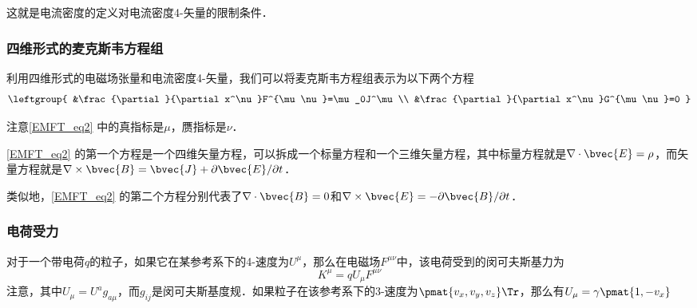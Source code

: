 这就是电流密度的定义对电流密度4-矢量的限制条件．


\subsubsection{四维形式的麦克斯韦方程组}

利用四维形式的电磁场张量和电流密度4-矢量，我们可以将麦克斯韦方程组表示为以下两个方程
\begin{equation}\label{EMFT_eq2}
\leftgroup{
    &\frac{\partial}{\partial x^\nu}F^{\mu\nu}=\mu_0J^\mu\\
    &\frac{\partial}{\partial x^\nu}G^{\mu\nu}=0
}
\end{equation}

注意\autoref{EMFT_eq2} 中的真指标是$\mu$，赝指标是$\nu$．

\autoref{EMFT_eq2} 的第一个方程是一个四维矢量方程，可以拆成一个标量方程和一个三维矢量方程，其中标量方程就是$\nabla\cdot\bvec{E}=\rho$，而矢量方程就是$\nabla\times\bvec{B}=\bvec{J}+\partial\bvec{E}/\partial t$． 

类似地，\autoref{EMFT_eq2} 的第二个方程分别代表了$\nabla\cdot\bvec{B}=0$和$\nabla\times\bvec{E}=-\partial\bvec{B}/\partial t$．

\subsubsection{电荷受力}

对于一个带电荷$q$的粒子，如果它在某参考系下的4-速度为$U^\mu$，那么在电磁场$F^{\mu\nu}$中，该电荷受到的闵可夫斯基力为
\begin{equation}
K^{\mu}=qU_\mu F^{\mu\nu}
\end{equation}
注意，其中$U_\mu=U^ag_{a\mu}$，而$g_{ij}$是闵可夫斯基度规．如果粒子在该参考系下的3-速度为$\pmat{v_x, v_y, v_z}\Tr$，那么有$U_\mu=\gamma\pmat{1, -v_x}$




